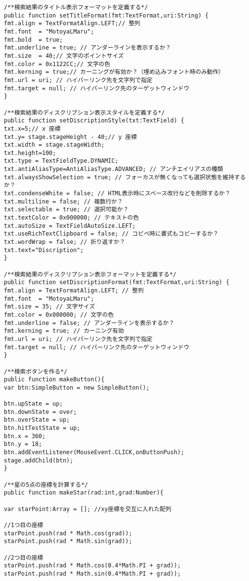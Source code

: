 {\begin{verbatim}
/**検索結果のタイトル表示フォーマットを定義する*/
public function setTitleFormat(fmt:TextFormat,uri:String) {
fmt.align = TextFormatAlign.LEFT;// 整列
fmt.font  = "MotoyaLMaru";
fmt.bold  = true;
fmt.underline = true; // アンダーラインを表示するか？
fmt.size  = 40;// 文字のポイントサイズ
fmt.color = 0x1122CC;// 文字の色
fmt.kerning = true;// カーニングが有効か？（埋め込みフォント時のみ動作）
fmt.url = uri; // ハイパーリンク先を文字列で指定
fmt.target = null; // ハイパーリンク先のターゲットウィンドウ
}

/**検索結果のディスクリプション表示スタイルを定義する*/
public function setDiscriptionStyle(txt:TextField) {
txt.x=5;// x 座標
txt.y= stage.stageHeight - 40;// y 座標
txt.width = stage.stageWidth;
txt.height=100;
txt.type = TextFieldType.DYNAMIC;
txt.antiAliasType=AntiAliasType.ADVANCED; // アンチエイリアスの種類
txt.alwaysShowSelection = true; // フォーカスが無くなっても選択状態を維持するか？
txt.condenseWhite = false; // HTML表示時にスペース改行などを削除するか？
txt.multiline = false; // 複数行か？
txt.selectable = true; // 選択可能か？
txt.textColor = 0x000000; // テキストの色
txt.autoSize = TextFieldAutoSize.LEFT;
txt.useRichTextClipboard = false; // コピペ時に書式もコピーするか？
txt.wordWrap = false; // 折り返すか？
txt.text="Discription";
}

/**検索結果のディスクリプション表示フォーマットを定義する*/
public function setDiscriptionFormat(fmt:TextFormat,uri:String) {
fmt.align = TextFormatAlign.LEFT; // 整列
fmt.font  = "MotoyaLMaru";
fmt.size = 35; // 文字サイズ
fmt.color = 0x000000; // 文字の色
fmt.underline = false; // アンダーラインを表示するか？
fmt.kerning = true; // カーニング有効
fmt.url = uri; // ハイパーリンク先を文字列で指定
fmt.target = null; // ハイパーリンク先のターゲットウィンドウ
}

/**検索ボタンを作る*/
public function makeButton(){
var btn:SimpleButton = new SimpleButton();

btn.upState = up;
btn.downState = over;
btn.overState = up;
btn.hitTestState = up;
btn.x = 360;
btn.y = 18;
btn.addEventListener(MouseEvent.CLICK,onButtonPush);
stage.addChild(btn);
}

/**星の5点の座標を計算する*/
public function makeStar(rad:int,grad:Number){

var starPoint:Array = []; //xy座標を交互に入れた配列

//1つ目の座標
starPoint.push(rad * Math.cos(grad));
starPoint.push(rad * Math.sin(grad));

//2つ目の座標
starPoint.push(rad * Math.cos(0.4*Math.PI + grad));
starPoint.push(rad * Math.sin(0.4*Math.PI + grad));


\end{verbatim}}
